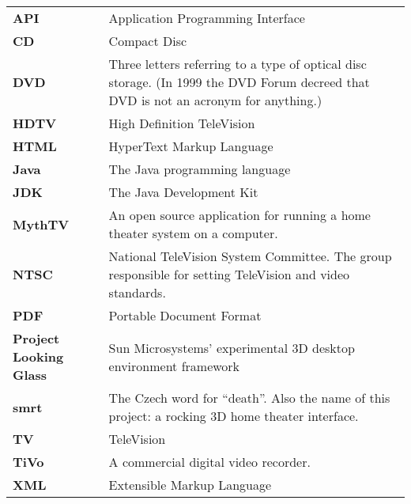 \documentclass[letterpaper, titlepage, 11pt]{article}
\begin{document}
\begin{tabular}{p{.3\linewidth}p{.6\linewidth}}
	\textbf{API}			& Application Programming Interface	\\
	\textbf{CD}			& Compact Disc				\\
	\textbf{DVD}			& Three letters referring to a type of
					  optical disc storage. (In 1999 the DVD
					  Forum decreed that DVD is not an
					  acronym for anything.)		\\
	\textbf{HDTV}			& High Definition TeleVision		\\
	\textbf{HTML}			& HyperText Markup Language		\\
	\textbf{Java}			& The Java programming language		\\
	\textbf{JDK}			& The Java Development Kit		\\
	\textbf{MythTV}			& An open source application for
					  running a home theater system on a
					  computer.				\\
	\textbf{NTSC}			& National TeleVision System Committee.
					  The group responsible for setting
					  TeleVision and video standards.	\\
	\textbf{PDF}			& Portable Document Format		\\
	\textbf{Project Looking Glass}	& Sun Microsystems' experimental 3D
					  desktop environment framework		\\
	\textbf{smrt}			& The Czech word for ``death''. Also
					  the name of this project: a rocking
					  3D home theater interface.		\\
	\textbf{TV}			& TeleVision				\\
	\textbf{TiVo}			& A commercial digital video recorder.	\\
	\textbf{XML}			& Extensible Markup Language		\\
\end{tabular}
\end{document}
